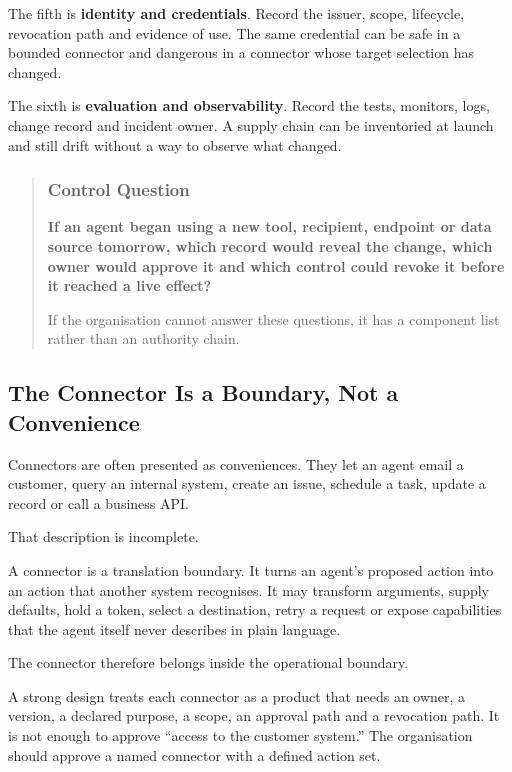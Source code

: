 The fifth is \textbf{identity and credentials}. Record the issuer,
scope, lifecycle, revocation path and evidence of use. The same
credential can be safe in a bounded connector and dangerous in a
connector whose target selection has changed.

The sixth is \textbf{evaluation and observability}. Record the tests,
monitors, logs, change record and incident owner. A supply chain can be
inventoried at launch and still drift without a way to observe what
changed.

\begin{quote}
\subsubsection{Control Question}\label{control-question}

\textbf{If an agent began using a new tool, recipient, endpoint or data
source tomorrow, which record would reveal the change, which owner would
approve it and which control could revoke it before it reached a live
effect?}

If the organisation cannot answer these questions, it has a component
list rather than an authority chain.
\end{quote}

\subsection{The Connector Is a Boundary, Not a
Convenience}\label{the-connector-is-a-boundary-not-a-convenience}

Connectors are often presented as conveniences. They let an agent email
a customer, query an internal system, create an issue, schedule a task,
update a record or call a business API.

That description is incomplete.

A connector is a translation boundary. It turns an agent's proposed
action into an action that another system recognises. It may transform
arguments, supply defaults, hold a token, select a destination, retry a
request or expose capabilities that the agent itself never describes in
plain language.

The connector therefore belongs inside the operational boundary.

A strong design treats each connector as a product that needs an owner,
a version, a declared purpose, a scope, an approval path and a
revocation path. It is not enough to approve ``access to the customer
system.'' The organisation should approve a named connector with a
defined action set.

